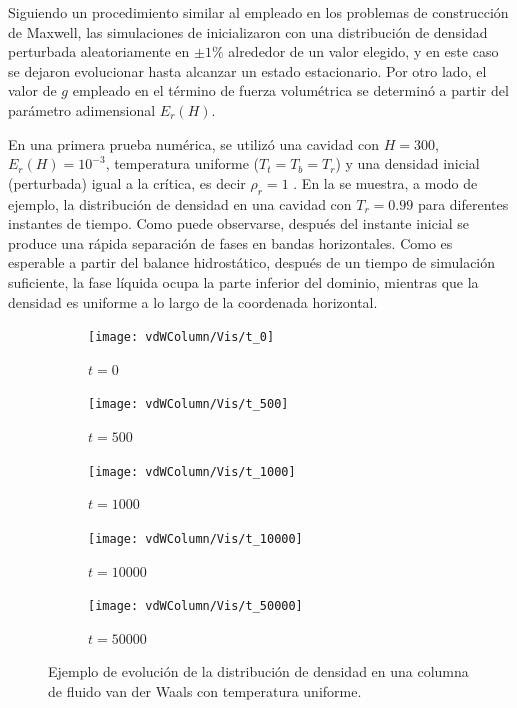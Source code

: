 Siguiendo un procedimiento similar al empleado en los problemas de construcci\'on de Maxwell, las simulaciones de inicializaron con una distribuci\'on de densidad perturbada aleatoriamente en $\pm1\%$ alrededor de un valor elegido, y en este caso se dejaron evolucionar hasta alcanzar un estado estacionario. Por otro lado, el valor de $g$ empleado en el t\'ermino de fuerza volum\'etrica se determin\'o a partir del par\'ametro adimensional $E_r(H)$.

En una primera prueba num\'erica, se utiliz\'o una cavidad con $H=300$, $E_r(H)=10^{-3}$, temperatura uniforme ($T_t = T_b = T_r$) y una densidad inicial (perturbada) igual a la cr\'itica, es decir $\rho_r=1$ . En la  se muestra, a modo de ejemplo, la distribuci\'on de densidad en una cavidad con $T_r=0.99$ para diferentes instantes de tiempo. Como puede observarse, despu\'es del instante inicial se produce una r\'apida separaci\'on de fases en  bandas horizontales. Como es esperable a partir del balance hidrost\'atico, despu\'es de un tiempo de simulaci\'on suficiente, la fase l\'iquida ocupa la parte inferior del dominio, mientras que la densidad es uniforme a lo largo de la coordenada horizontal.

\begin{figure}[htb]
    \centering
    \begin{subfigure}[t]{0.18\textwidth}
        \centering
        \texttt{[image: vdWColumn/Vis/t\_0]}   
        \caption{$t=0$}     
    \end{subfigure}
    \begin{subfigure}[t]{0.18\textwidth}
        \centering
        \texttt{[image: vdWColumn/Vis/t\_500]}   
        \caption{$t=500$}     
    \end{subfigure}
    \begin{subfigure}[t]{0.18\textwidth}
        \centering
        \texttt{[image: vdWColumn/Vis/t\_1000]}   
        \caption{$t=1000$}     
    \end{subfigure}    
    \begin{subfigure}[t]{0.18\textwidth}
        \centering
        \texttt{[image: vdWColumn/Vis/t\_10000]}   
        \caption{$t=10000$}     
    \end{subfigure}      
    \begin{subfigure}[t]{0.18\textwidth}
        \centering
        \texttt{[image: vdWColumn/Vis/t\_50000]}   
        \caption{$t=50000$}
    \end{subfigure}      
    \caption{Ejemplo de evoluci\'on de la distribuci\'on de densidad en una columna de fluido van der Waals con temperatura uniforme.}
	\label{fig:vdWColumn_evolucion}
\end{figure}

